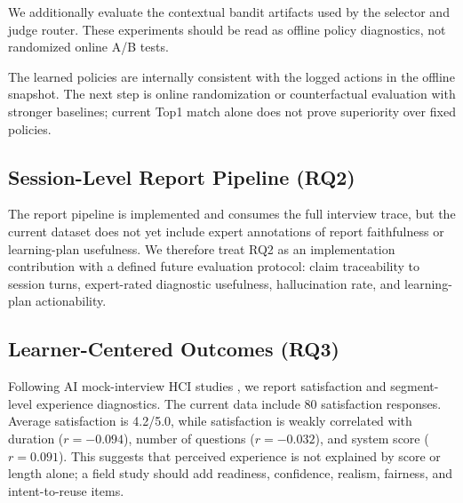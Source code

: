 ﻿\documentclass[final,3p,times,authoryear]{elsarticle}
\begin{document}
\noindent We additionally evaluate the contextual bandit artifacts used by the selector and judge router. These experiments should be read as offline policy diagnostics, not randomized online A/B tests.

\begin{table}[H]
\centering
\caption{Offline policy diagnostics generated by the reproduction pipeline.}
\label{tab:offline_policy}
\end{table}

\noindent The learned policies are internally consistent with the logged actions in the offline snapshot. The next step is online randomization or counterfactual evaluation with stronger baselines; current Top1 match alone does not prove superiority over fixed policies.

\subsection{Session-Level Report Pipeline (RQ2)}
\label{sec:results_report}

\noindent The report pipeline is implemented and consumes the full interview trace, but the current dataset does not yet include expert annotations of report faithfulness or learning-plan usefulness. We therefore treat RQ2 as an implementation contribution with a defined future evaluation protocol: claim traceability to session turns, expert-rated diagnostic usefulness, hallucination rate, and learning-plan actionability.

\subsection{Learner-Centered Outcomes (RQ3)}
\label{sec:results_user}

\noindent Following AI mock-interview HCI studies \cite{conversate2024,virtual_interviewers2025}, we report satisfaction and segment-level experience diagnostics. The current data include 80 satisfaction responses. Average satisfaction is 4.2/5.0, while satisfaction is weakly correlated with duration ($r=-0.094$), number of questions ($r=-0.032$), and system score ($r=0.091$). This suggests that perceived experience is not explained by score or length alone; a field study should add readiness, confidence, realism, fairness, and intent-to-reuse items.
\end{document}
